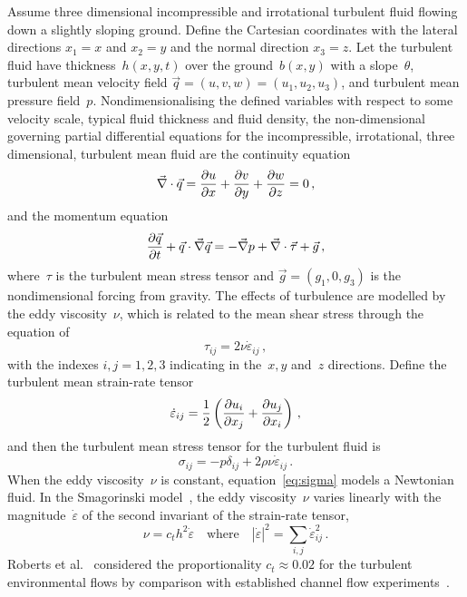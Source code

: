 \documentclass[twocolumn]{afmc_art}
\newcommand{\ros}{{\dot\varepsilon}}
\begin{document}
Assume three dimensional incompressible and irrotational turbulent fluid flowing down a slightly sloping ground. 
Define the Cartesian coordinates with the lateral directions $x_1=x$ and $x_2=y$ and the normal direction $x_3=z$. 
Let the turbulent fluid have thickness~$h(x,y,t)$ over the ground~$b(x,y)$ with a slope~$\theta$, turbulent mean velocity field $\vec q=(u,v,w)=(u_1,u_2,u_3)$, and turbulent mean pressure field~$p$.
Nondimensionalising the defined variables with respect to some velocity scale, typical fluid thickness and fluid density, the non-dimensional governing partial differential equations for the incompressible, irrotational, three dimensional, turbulent mean fluid are the continuity equation
\begin{equation}
    \divv\vec q=\D xu+\D yv+\D zw=0\,,\label{eq:cont}
\end{equation}
and the momentum equation
\begin{equation}
    \D t{\vec q} +\vec q\cdot\grad\vec q
    =-\grad p +\divv\vec\tau +\vec{g}\,,\label{eq:mom}
\end{equation}
where~$\tau$ is the turbulent mean stress tensor and $\vec g=(g_1,0,g_3)$ is the nondimensional forcing from gravity.
The effects of turbulence are modelled by the eddy viscosity~$\nu$, which is related to the mean shear stress through the equation of
\begin{equation}
\tau_{ij}=2\nu\ros_{ij}\,,\label{eq:tau}
\end{equation}
with the indexes $i,j=1,2,3$ indicating in the~$x, y$ and~$z$ directions.
Define the turbulent mean strain-rate tensor~\cite[e.g.]{Roberts2008,Georgiev2008}
\begin{equation}
	\ros_{ij} =\frac12\left( \D{x_j}{u_i} +\D{x_i}{u_j}\right) \,,\label{eq:strainrate}
\end{equation}
and then the turbulent mean stress tensor for the turbulent fluid is
\begin{equation}
\sigma_{ij}=-p\delta_{ij}+2\rho\nu\ros_{ij}\,.\label{eq:sigma}
\end{equation}
When the eddy viscosity~$\nu$ is constant, equation~\eqref{eq:sigma} models a Newtonian fluid.
In the Smagorinski model~\cite[e.g.]{Ozgokmen2007a}, the eddy viscosity~$\nu$ varies linearly with the magnitude~$\ros$ of the second invariant of the strain-rate tensor,
\begin{equation}
  \nu=c_th^2\ros\quad\text{where}\quad |\ros|^2=\sum_{i,j}\ros_{ij}^2\,.\label{eq:nu}
\end{equation}
Roberts et al.~\cite{Roberts2008} considered the proportionality $c_t\approx0.02$ for the turbulent environmental flows by comparison with established channel flow experiments~\cite[e.g.]{Nezu2005}.
\end{document}
